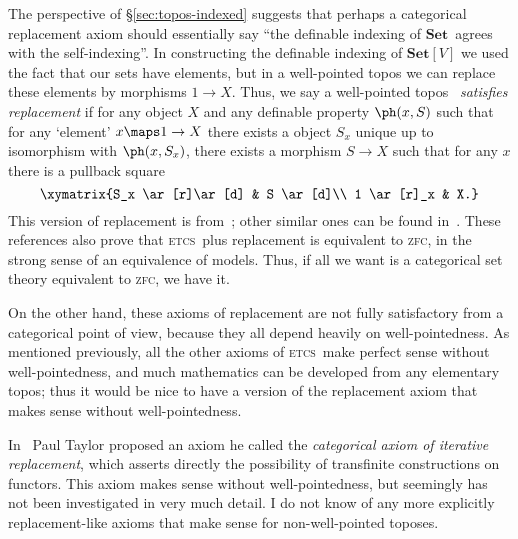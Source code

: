 \documentclass[12pt]{amsart}
\newcommand{\Set}{\ensuremath{\mathbf{Set}}}
\def\zfc{\textsc{zfc}}
\def\wptnc{\textsc{wptnc}}
\def\etcs{\textsc{etcs}}
\begin{document}
The perspective of \S\ref{sec:topos-indexed} suggests that perhaps a
categorical replacement axiom should essentially say ``the definable
indexing of \Set\ agrees with the self-indexing''.  In constructing
the definable indexing of $\Set[V]$ we used the fact that our sets
have elements, but in a well-pointed topos we can replace these
elements by morphisms $1\to X$.  Thus, we say a well-pointed topos
\bS\ \emph{satisfies replacement} if for any object $X$ and any
definable property $\ph(x,S)$ such that for any `element' $x\maps 1\to
X$ there exists a object $S_x$ unique up to isomorphism with
$\ph(x,S_x)$, there exists a morphism $S\to X$ such that for any $x$
there is a pullback square
\[\xymatrix{S_x \ar[r]\ar[d] & S \ar[d]\\
  1 \ar[r]_x & X.}\]
This version of replacement is from~\cite{mclarty:catstruct}; other
similar ones can be found in~\cite{osius:cat-setth,lawvere:etcs-long}.
These references also prove that \etcs\ plus replacement is equivalent
to \zfc, in the strong sense of an equivalence of models.  Thus, if
all we want is a categorical set theory equivalent to \zfc, we have
it.


On the other hand, these axioms of replacement are not fully
satisfactory from a categorical point of view, because they all depend
heavily on well-pointedness.  As mentioned previously, all the other
axioms of \etcs\ make perfect sense without well-pointedness, and much
mathematics can be developed from any elementary topos; thus it would
be nice to have a version of the replacement axiom that makes sense
without well-pointedness.

In~\cite[Ch.~9]{taylor:pracfdn} Paul Taylor proposed an axiom he
called the \emph{categorical axiom of iterative replacement}, which
asserts directly the possibility of transfinite constructions on
functors.  This axiom makes sense without well-pointedness, but
seemingly has not been investigated in very much detail.  I do not
know of any more explicitly replacement-like axioms that make sense
for non-well-pointed toposes.

\end{document}
